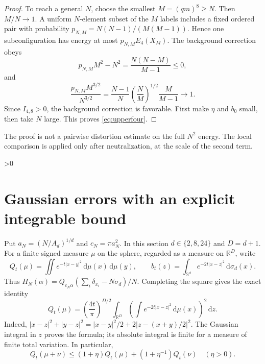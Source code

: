 \documentclass[11pt,a4paper]{article}
\theoremstyle{definition}
\newcommand{\R}{\mathbb R}
\newcommand{\Sph}{\mathbb S}
\newcommand{\dd}{\,\mathrm d}
\newcommand{\abs}[1]{\lvert#1\rvert}
\numberwithin{equation}{section}
\let\originalsection\section
\renewcommand{\section}{\ifnum\value{section}>0\clearpage\fi\originalsection}
\begin{document}
\begin{proof}
To reach a general $N$, choose the smallest $M=(qm)^8\ge N$. Then $M/N\to1$. A uniform $N$-element subset of the $M$ labels includes a fixed ordered pair with probability
$p_{N,M}=N(N-1)/(M(M-1))$. Hence one subconfiguration has energy at most $p_{N,M}E_4(X_M)$. The background correction obeys
\begin{equation}\label{eq:backgroundsampling}
 p_{N,M}M^2-N^2=\frac{N(N-M)}{M-1}\le0,
\end{equation}
and
\begin{equation}
 \frac{p_{N,M}M^{3/2}}{N^{3/2}}
 =\frac{N-1}{N}\left(\frac NM\right)^{1/2}\frac M{M-1}\longrightarrow1.
\end{equation}
Since $I_{4,8}>0$, the background correction is favorable. First make $\eta$ and $b_0$ small, then take $N$ large. This proves \eqref{eq:upperfour}.
\end{proof}
The proof is not a pairwise distortion estimate on the full $N^2$ energy. The local comparison is applied only after neutralization, at the scale of the second term.

\section{Gaussian errors with an explicit integrable bound}\label{sec:gaussian-upper}
Put $a_N=(N/A_d)^{1/d}$ and $c_N=\pi a_N^2$. In this section $d\in\{2,8,24\}$ and $D=d+1$. For a finite signed measure $\mu$ on the sphere, regarded as a measure on $\R^D$, write
\[
 Q_t(\mu)=\iint e^{-t\abs{x-y}^2}\dd\mu(x)\dd\mu(y),\qquad
 b_t(z)=\int_{\Sph^d}e^{-2t\abs{x-z}^2}\dd\sigma_d(x).
\]
Thus $H_N(\alpha)=Q_{c_N\alpha}(\sum_i\delta_{x_i}-N\sigma_d)/N$.
Completing the square gives the exact identity
\begin{equation}\label{eq:bumpsquare}
 Q_t(\mu)=\left(\frac{4t}{\pi}\right)^{D/2}
 \int_{\R^D}\left(\int e^{-2t\abs{x-z}^2}\dd\mu(x)\right)^2\dd z.
\end{equation}
Indeed, $\abs{x-z}^2+\abs{y-z}^2=\abs{x-y}^2/2+2\abs{z-(x+y)/2}^2$. The Gaussian integral in $z$ proves the formula; its absolute integral is finite for a measure of finite total variation. In particular,
\begin{equation}\label{eq:young}
 Q_t(\mu+\nu)\le(1+\eta)Q_t(\mu)+(1+\eta^{-1})Q_t(\nu)
 \quad(\eta>0).
\end{equation}
\end{document}
